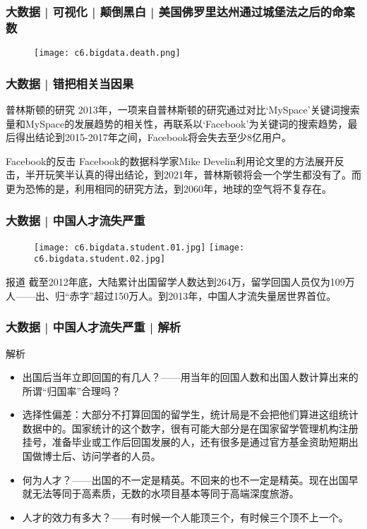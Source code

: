 \begin{frame}
  \frametitle{大数据 | 可视化 | 颠倒黑白 | 美国佛罗里达州通过城堡法之后的命案数}
  \begin{figure}
    \centering
    \texttt{[image: c6.bigdata.death.png]}
  \end{figure}
\end{frame}

\begin{frame}
  \frametitle{大数据 | 错把相关当因果}
  \begin{block}{普林斯顿的研究}
    2013年，一项来自普林斯顿的研究通过对比`MySpace'关键词搜索量和MySpace的发展趋势的相关性，再联系以`Facebook'为关键词的搜索趋势，最后得出结论到2015-2017年之间，Facebook将会失去至少8亿用户。
  \end{block}
  \pause
  \begin{block}{Facebook的反击}
    Facebook的数据科学家Mike Develin利用论文里的方法展开反击，半开玩笑半认真的得出结论，到2021年，普林斯顿将会一个学生都没有了。而更为恐怖的是，利用相同的研究方法，到2060年，地球的空气将不复存在。
  \end{block}
\end{frame}

\begin{frame}
  \frametitle{大数据 | 中国人才流失严重}
  \begin{figure}
    \centering
    \texttt{[image: c6.bigdata.student.01.jpg]}
    \texttt{[image: c6.bigdata.student.02.jpg]}
  \end{figure}
  \begin{block}{报道}
    截至2012年底，大陆累计出国留学人数达到264万，留学回国人员仅为109万人——出、归“赤字”超过150万人。到2013年，中国人才流失量居世界首位。
  \end{block}
\end{frame}

\begin{frame}
  \frametitle{大数据 | 中国人才流失严重 | 解析}
  \begin{block}{解析}
    \begin{itemize}
      \item 出国后当年立即回国的有几人？——用当年的回国人数和出国人数计算出来的所谓“归国率”合理吗？
      \item 选择性偏差：大部分不打算回国的留学生，统计局是不会把他们算进这组统计数据中的。国家统计的这个数字，很有可能大部分是在国家留学管理机构注册挂号，准备毕业或工作后回国发展的人，还有很多是通过官方基金资助短期出国做博士后、访问学者的人员。
      \item 何为人才？——出国的不一定是精英。不回来的也不一定是精英。现在出国早就无法等同于高素质，无数的水项目基本等同于高端深度旅游。
      \item 人才的效力有多大？——有时候一个人能顶三个，有时候三个顶不上一个。
    \end{itemize}
  \end{block}
\end{frame}

